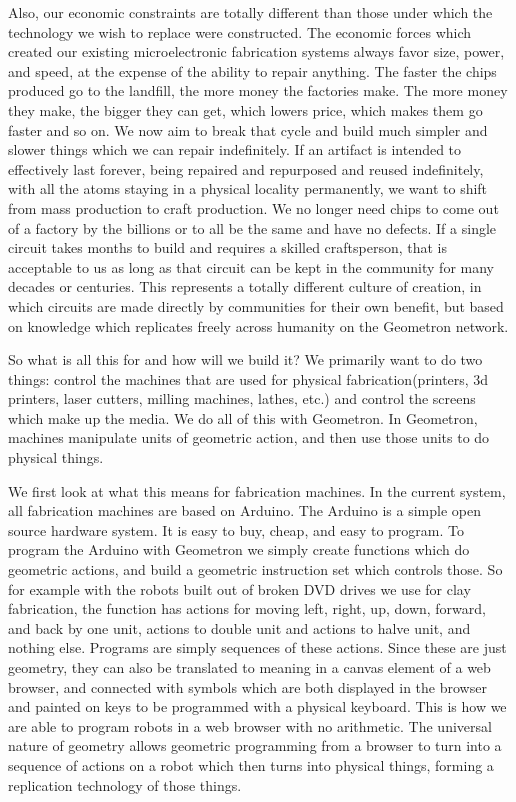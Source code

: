 Also, our economic constraints are totally different than those under
which the technology we wish to replace were constructed. The economic
forces which created our existing microelectronic fabrication systems
always favor size, power, and speed, at the expense of the ability to
repair anything. The faster the chips produced go to the landfill, the
more money the factories make. The more money they make, the bigger they
can get, which lowers price, which makes them go faster and so on. We
now aim to break that cycle and build much simpler and slower things
which we can repair indefinitely. If an artifact is intended to
effectively last forever, being repaired and repurposed and reused
indefinitely, with all the atoms staying in a physical locality
permanently, we want to shift from mass production to craft production.
We no longer need chips to come out of a factory by the billions or to
all be the same and have no defects. If a single circuit takes months to
build and requires a skilled craftsperson, that is acceptable to us as
long as that circuit can be kept in the community for many decades or
centuries. This represents a totally different culture of creation, in
which circuits are made directly by communities for their own benefit,
but based on knowledge which replicates freely across humanity on the
Geometron network.

So what is all this for and how will we build it? We primarily want to
do two things: control the machines that are used for physical
fabrication(printers, 3d printers, laser cutters, milling machines,
lathes, etc.) and control the screens which make up the media. We do all
of this with Geometron. In Geometron, machines manipulate units of
geometric action, and then use those units to do physical things.

We first look at what this means for fabrication machines. In the
current system, all fabrication machines are based on Arduino. The
Arduino is a simple open source hardware system. It is easy to buy,
cheap, and easy to program. To program the Arduino with Geometron we
simply create functions which do geometric actions, and build a
geometric instruction set which controls those. So for example with the
robots built out of broken DVD drives we use for clay fabrication, the
function has actions for moving left, right, up, down, forward, and back
by one unit, actions to double unit and actions to halve unit, and
nothing else. Programs are simply sequences of these actions. Since
these are just geometry, they can also be translated to meaning in a
canvas element of a web browser, and connected with symbols which are
both displayed in the browser and painted on keys to be programmed with
a physical keyboard. This is how we are able to program robots in a web
browser with no arithmetic. The universal nature of geometry allows
geometric programming from a browser to turn into a sequence of actions
on a robot which then turns into physical things, forming a replication
technology of those things.


